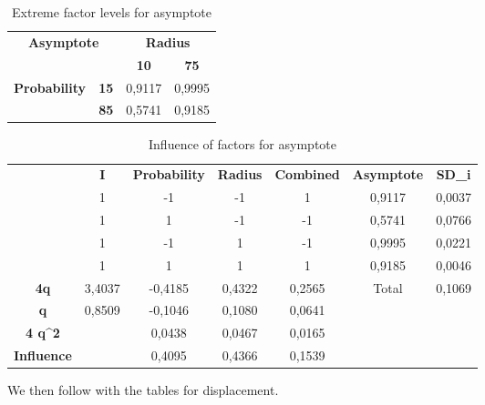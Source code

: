 \begin{table}[H]
\centering
\begin{tabular}{|cc|cc|}
\hline
\multicolumn{2}{|c|}{\multirow{2}{*}{\textbf{Asymptote}}} & \multicolumn{2}{c|}{\textbf{Radius}} \\ \cline{3-4} 
\multicolumn{2}{|c|}{} & \multicolumn{1}{c|}{\textbf{10}} & \textbf{75} \\ \hline
\multicolumn{1}{|c|}{\multirow{2}{*}{\textbf{Probability}}} & \textbf{15} & \multicolumn{1}{c|}{0,9117} & 0,9995 \\ \cline{2-4} 
\multicolumn{1}{|c|}{} & \textbf{85} & \multicolumn{1}{c|}{0,5741} & 0,9185 \\ \hline
\end{tabular}
\caption{Extreme factor levels for asymptote}
\end{table}

\begin{table}[H]
\centering
\begin{tabular}{c|c|c|c|c|cc}
\cline{2-7}
 & \textbf{I} & \textbf{Probability} & \textbf{Radius} & \textbf{Combined} & \multicolumn{1}{c|}{\textbf{Asymptote}} & \multicolumn{1}{c|}{\textbf{SD\_i}} \\ \cline{2-7} 
 & 1 & -1 & -1 & 1 & \multicolumn{1}{c|}{0,9117} & \multicolumn{1}{c|}{0,0037} \\ \cline{2-7} 
 & 1 & 1 & -1 & -1 & \multicolumn{1}{c|}{0,5741} & \multicolumn{1}{c|}{0,0766} \\ \cline{2-7} 
 & 1 & -1 & 1 & -1 & \multicolumn{1}{c|}{0,9995} & \multicolumn{1}{c|}{0,0221} \\ \cline{2-7} 
 & 1 & 1 & 1 & 1 & \multicolumn{1}{c|}{0,9185} & \multicolumn{1}{c|}{0,0046} \\ \hline
\multicolumn{1}{|c|}{\textbf{4q}} & 3,4037 & -0,4185 & 0,4322 & 0,2565 & \multicolumn{1}{c|}{Total} & \multicolumn{1}{c|}{0,1069} \\ \hline
\multicolumn{1}{|c|}{\textbf{q}} & 0,8509 & -0,1046 & 0,1080 & 0,0641 &  &  \\ \cline{1-5}
\multicolumn{1}{|c|}{\textbf{4 q\textasciicircum{}2}} &  & 0,0438 & 0,0467 & 0,0165 &  &  \\ \cline{1-5}
\multicolumn{1}{|c|}{\textbf{Influence}} &  & 0,4095 & 0,4366 & 0,1539 &  &  \\ \cline{1-5}
\end{tabular}
\caption{Influence of factors for asymptote}
\end{table}

We then follow with the tables for displacement.

